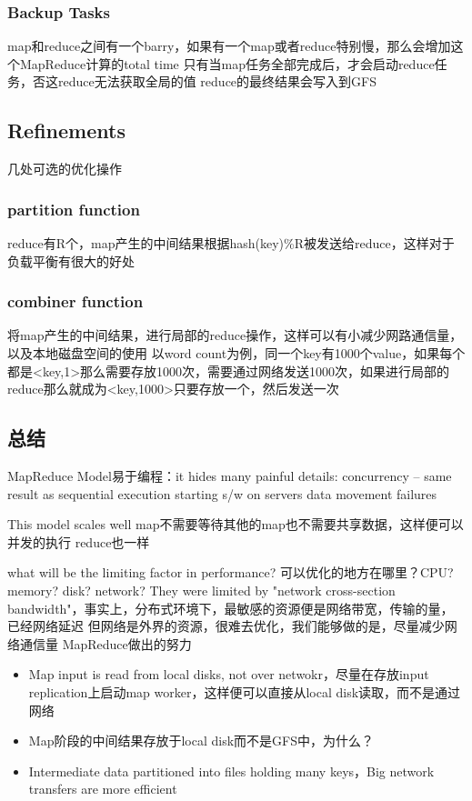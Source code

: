 \subsubsection{Backup Tasks}
map和reduce之间有一个barry，如果有一个map或者reduce特别慢，那么会增加这个MapReduce计算的total time
只有当map任务全部完成后，才会启动reduce任务，否这reduce无法获取全局的值
reduce的最终结果会写入到GFS

\subsection{Refinements}
几处可选的优化操作
\subsubsection{partition function}
reduce有R个，map产生的中间结果根据hash(key)\%R被发送给reduce，这样对于负载平衡有很大的好处

\subsubsection{combiner function}
将map产生的中间结果，进行局部的reduce操作，这样可以有小减少网路通信量，以及本地磁盘空间的使用
以word count为例，同一个key有1000个value，如果每个都是<key,1>那么需要存放1000次，需要通过网络发送1000次，如果进行局部的reduce那么就成为<key,1000>只要存放一个，然后发送一次

\subsection{总结}
MapReduce Model易于编程：it hides many painful details:
concurrency -- same result as sequential execution
starting s/w on servers
data movement
failures

This model scales well
map不需要等待其他的map也不需要共享数据，这样便可以并发的执行
reduce也一样

what will be the limiting factor in performance?
可以优化的地方在哪里？CPU? memory? disk? network?
They were limited by "network cross-section bandwidth"，事实上，分布式环境下，最敏感的资源便是网络带宽，传输的量，已经网络延迟
但网络是外界的资源，很难去优化，我们能够做的是，尽量减少网络通信量
MapReduce做出的努力
\begin{itemize}
  \item Map input is read from local disks, not over netwokr，尽量在存放input replication上启动map worker，这样便可以直接从local disk读取，而不是通过网络
  \item Map阶段的中间结果存放于local disk而不是GFS中，为什么？
  \item Intermediate data partitioned into files holding many keys，Big network transfers are more efficient
\end{itemize}

